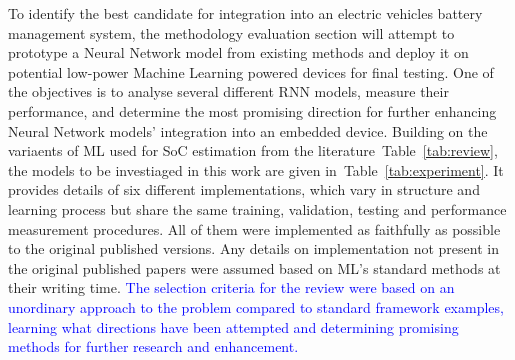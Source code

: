 %
To identify the best candidate for integration into an electric vehicles battery management system, the methodology evaluation section will attempt to prototype a Neural Network model from existing methods and deploy it on potential low-power Machine Learning powered devices for final testing.
One of the objectives is to analyse several different RNN models, measure their performance, and determine the most promising direction for further enhancing Neural Network models' integration into an embedded device.
Building on the variaents of ML used for SoC estimation from the literature~\mbox{Table~\ref{tab:review}}, the models to be investiaged in this work are given in~\mbox{Table~\ref{tab:experiment}}.
It provides details of six different implementations, which vary in structure and learning process but share the same training, validation, testing and performance measurement procedures.
All of them were implemented as faithfully as possible to the original published versions.
Any details on implementation not present in the original published papers were assumed based on ML's standard methods at their writing time.
\textcolor{blue}{
The selection criteria for the review were based on an unordinary approach to the problem compared to standard framework examples, learning what directions have been attempted and determining promising methods for further research and enhancement.
}
